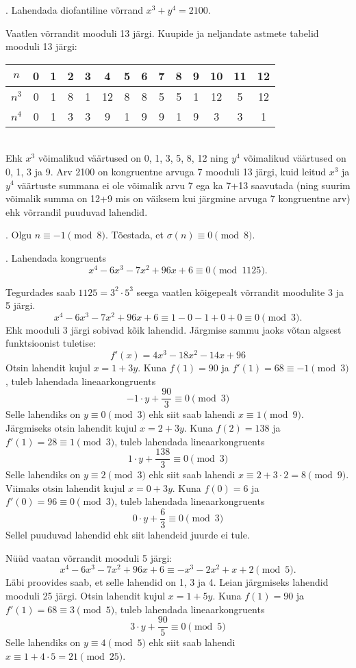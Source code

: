 \documentclass[a4paper, 10pt]{article}
\begin{document}
. Lahendada diofantiline võrrand $x^3+y^4=2100$.

\bigskip
Vaatlen võrrandit mooduli 13 järgi. Kuupide ja neljandate astmete tabelid mooduli 13 järgi:\\
\begin{tabular}{c|c|c|c|c|c|c|c|c|c|c|c|c|c}
$n$&0&1&2&3&4&5&6&7&8&9&10&11&12\\
\hline
$n^3$&0&1&8&1&12&8&8&5&5&1&12&5&12\\
\hline
$n^4$&0&1&3&3&9&1&9&9&1&9&3&3&1
\end{tabular}\\
Ehk $x^3$ võimalikud väärtused on 0, 1, 3, 5, 8, 12 ning $y^4$ võimalikud väärtused on 0, 1, 3 ja 9. Arv 2100 on kongruentne arvuga 7 mooduli 13 järgi, kuid leitud $x^3$ ja $y^4$ väärtuste summana ei ole võimalik arvu 7 ega ka 7+13 saavutada (ning suurim võimalik summa on 12+9 mis on väiksem kui järgmine arvuga 7 kongruentne arv) ehk võrrandil puuduvad lahendid.
\bigskip

. Olgu $n\equiv -1\pmod{8}$. Tõestada, et $\sigma(n)\equiv 0 \pmod{8}$. 

\bigskip

\pagebreak

. Lahendada kongruents $$x^4-6x^3-7x^2+96x+6\equiv 0 \pmod{1125}.$$

\bigskip
Tegurdades saab $1125=3^2\cdot5^3$ seega vaatlen kõigepealt võrrandit moodulite 3 ja 5 järgi. $$x^4-6x^3-7x^2+96x+6\equiv 1-0-1+0+0\equiv0  \pmod{3}.$$ Ehk mooduli 3 järgi sobivad kõik lahendid. Järgmise sammu jaoks võtan algsest funktsioonist tuletise: $$f'(x)=4x^3-18x^2-14x+96$$ Otsin lahendit kujul $x=1+3y$. Kuna $f(1)=90$ ja $f'(1)=68\equiv-1\pmod3$, tuleb lahendada lineaarkongruents $$-1\cdot y+\frac{90}{3}\equiv0\pmod3$$ Selle lahendiks on $y\equiv0\pmod3$ ehk siit saab lahendi $x\equiv1\pmod9$. Järgmiseks otsin lahendit kujul $x=2+3y$. Kuna $f(2)=138$ ja $f'(1)=28\equiv1\pmod3$, tuleb lahendada lineaarkongruents $$1\cdot y+\frac{138}{3}\equiv0\pmod3$$ Selle lahendiks on $y\equiv2\pmod3$ ehk siit saab lahendi $x\equiv2+3\cdot2=8\pmod9$. Viimaks otsin lahendit kujul $x=0+3y$. Kuna $f(0)=6$ ja $f'(0)=96\equiv0\pmod3$, tuleb lahendada lineaarkongruents $$0\cdot y+\frac{6}{3}\equiv0\pmod3$$ Sellel puuduvad lahendid ehk siit lahendeid juurde ei tule.

Nüüd vaatan võrrandit mooduli 5 järgi:$$x^4-6x^3-7x^2+96x+6\equiv -x^3-2x^2+x+2  \pmod{5}.$$ Läbi proovides saab, et selle lahendid on 1, 3 ja 4. Leian järgmiseks lahendid mooduli 25 järgi. Otsin lahendit kujul $x=1+5y$. Kuna $f(1)=90$ ja $f'(1)=68\equiv3\pmod5$, tuleb lahendada lineaarkongruents $$3\cdot y+\frac{90}{5}\equiv0\pmod5$$ Selle lahendiks on $y\equiv4\pmod5$ ehk siit saab lahendi $x\equiv1+4\cdot5=21\pmod{25}$.
\end{document}
